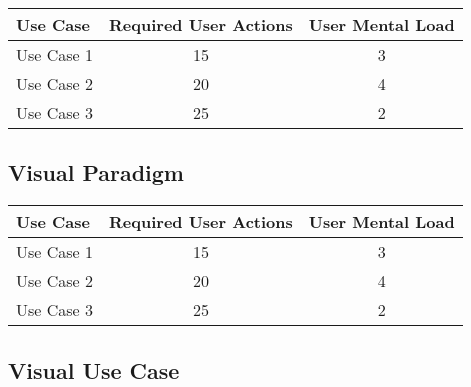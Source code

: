 \begin{tabularx}{\textwidth}{Xcc}
\textbf{Use Case} & \textbf{Required User Actions} & \textbf{User Mental Load}\\
\hline
Use Case 1                          & 15 & 3 \\
Use Case 2                          & 20 & 4 \\
Use Case 3                          & 25 & 2
\end{tabularx}

\subsection{Visual Paradigm}




\begin{tabularx}{\textwidth}{Xcc}
\textbf{Use Case} & \textbf{Required User Actions} & \textbf{User Mental Load}\\
\hline
Use Case 1                          & 15 & 3 \\
Use Case 2                          & 20 & 4 \\
Use Case 3                          & 25 & 2
\end{tabularx}

\subsection{Visual Use Case}


